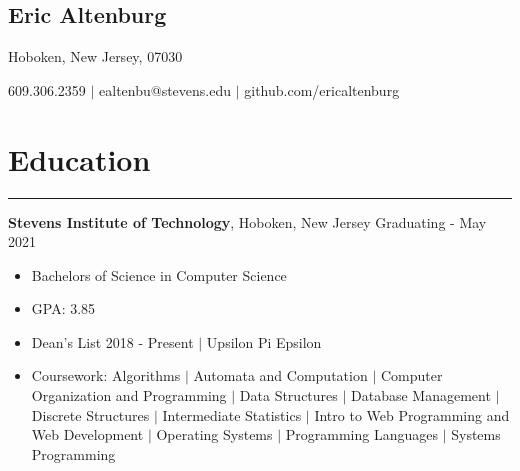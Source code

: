 \documentclass[10pt]{article}
\newcommand{\name}[1]{\begin{center}\section*{\huge #1}\end{center}}
\newcommand{\topinfo}[1]{\begin{center}\vspace{-0.15cm}#1\vspace{-0.15cm}\end{center}}
\newcommand{\resumesection}[1]{\vspace{-0.2cm}\section*{#1}\vspace{-0.2cm}\hrule\vspace{0.2cm}}
\begin{document}
\name{Eric Altenburg}
\topinfo{Hoboken, New Jersey, 07030}

\topinfo{609.306.2359 $\vert$ ealtenbu@stevens.edu $\vert$ github.com/ericaltenburg}








\resumesection{Education}
\textbf{Stevens Institute of Technology}, Hoboken, New Jersey \hfill Graduating - May 2021
\begin{itemize}
	\item Bachelors of Science in Computer Science
	\item GPA: 3.85 
	\item Dean's List 2018 - Present $\vert$ Upsilon Pi Epsilon 
	\item Coursework: Algorithms $\vert$ Automata and Computation $\vert$ Computer Organization and Programming $\vert$ Data Structures $\vert$ Database Management $\vert$ Discrete Structures $\vert$ Intermediate Statistics $\vert$ Intro to Web Programming and Web Development $\vert$ Operating Systems $\vert$ Programming Languages $\vert$ Systems Programming
\end{itemize}
\end{document}
